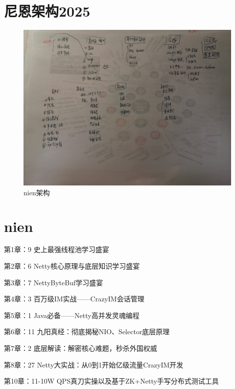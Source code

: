 \documentclass[10pt]{article}
\begin{document}
\newpage
\section{尼恩架构2025}
\begin{figure}[h]
  \centering
  \begin{sideways} %
    \includegraphics[width=1.1\textwidth]{images/nienjiagou2025.jpg} %
  \end{sideways}
    \caption{nien架构}
    \label{fig:example}
  \end{figure}


\newpage
\section{nien}

第1章：9 史上最强线程池学习盛宴

第2章：6 Netty核心原理与底层知识学习盛宴

第3章：7 NettyByteBuf学习盛宴

第4章：3 百万级IM实战——CrazyIM会话管理

第5章：1 Java必备——Netty高并发灵魂编程

第6章：11 九阳真经：彻底揭秘NIO、Selector底层原理

第7章：2 底层解读：解密核心难题，秒杀外国权威

第8章：27 Netty大实战：从0到1开始亿级流量CrazyIM开发

第10章：11-10W QPS真刀实操以及基于ZK+Netty手写分布式测试工具
\end{document}
